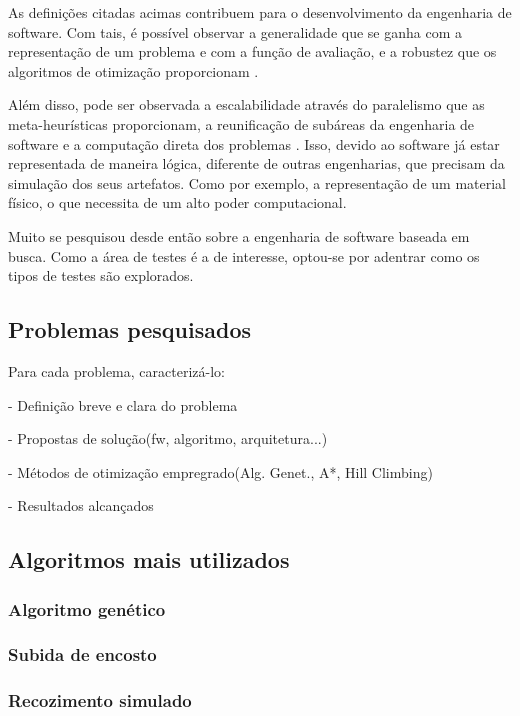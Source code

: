 As definições citadas acimas contribuem para o desenvolvimento da engenharia de software. Com tais, é possível observar a generalidade que se ganha com a representação de um problema e com a função de avaliação, e a robustez que os algoritmos de otimização proporcionam \cite{harman2012search}. 

Além disso, pode ser observada a escalabilidade através do paralelismo que as meta-heurísticas proporcionam, a reunificação de subáreas da engenharia de software e a computação direta dos problemas \cite{harman2012search}. Isso, devido ao software já estar representada de maneira lógica, diferente de outras engenharias, que precisam da simulação dos seus artefatos. Como por exemplo, a representação de um material físico, o que necessita de um alto poder computacional.

Muito se pesquisou desde então sobre a engenharia de software baseada em busca. Como a área de testes é a de interesse, optou-se por adentrar como os tipos de testes são explorados.

\subsection{Problemas pesquisados}




Para cada problema, caracterizá-lo:

- Definição breve e clara do problema

- Propostas de solução(fw, algoritmo, arquitetura...)

- Métodos de otimização empregrado(Alg. Genet., A*, Hill Climbing)

- Resultados alcançados

\subsection{Algoritmos mais utilizados}

\subsubsection{Algoritmo genético}

\subsubsection{Subida de encosto}

\subsubsection{Recozimento simulado}








